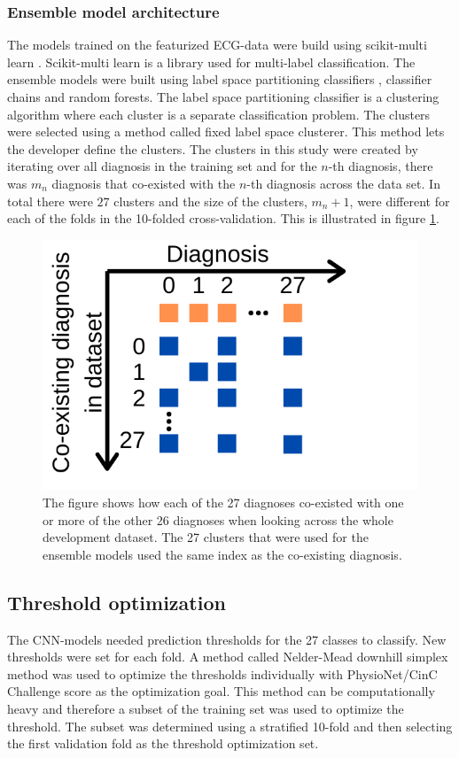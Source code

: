 \subsubsection{Ensemble model architecture}\hfill \break
The models trained on the featurized ECG-data were build using scikit-multi learn \cite{szymanski_scikit-multilearn_2019}. Scikit-multi learn is a library used for multi-label classification. The ensemble models were built using label space partitioning classifiers \cite{szymanski_how_2016}, classifier chains \cite{read_classifier_2009} and random forests. The label space partitioning classifier is a clustering algorithm where each cluster is a separate classification problem. The clusters were selected using a method called fixed label space clusterer. This method lets the developer define the clusters. The clusters in this study were created by iterating over all diagnosis in the training set and for the $n$-th diagnosis, there was $m_n$ diagnosis that co-existed with the $n$-th diagnosis across the data set. In total there were $27$ clusters and the size of the clusters, $m_n + 1$, were different for each of the folds in the 10-folded cross-validation. This is illustrated in figure \ref{fig:diagnosis_co_exist}.

\begin{figure}[!hbp]
    \centering
    \includegraphics[width=.6\textwidth]{Figures/Diagnosis_cluster_axis.png}
    \caption{The figure shows how each of the 27 diagnoses co-existed with one or more of the other 26 diagnoses when looking across the whole development dataset. The 27 clusters that were used for the ensemble models used the same index as the co-existing diagnosis.}
    \label{fig:diagnosis_co_exist}
\end{figure}



\subsection{Threshold optimization}
The CNN-models needed prediction thresholds for the 27 classes to classify. New thresholds were set for each fold. A method called Nelder-Mead downhill simplex method \cite{nelder_simplex_1965, virtanen_scipy_2020} was used to optimize the thresholds individually with PhysioNet/CinC Challenge score as the optimization goal. This method can be computationally heavy and therefore a subset of the training set was used to optimize the threshold. The subset was determined using a stratified 10-fold and then selecting the first validation fold as the threshold optimization set.

